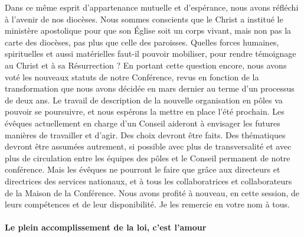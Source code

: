Dans ce même esprit d’appartenance mutuelle et d’espérance, nous avons réfléchi à l’avenir de nos diocèses. Nous sommes conscients que le Christ a institué le ministère apostolique pour que son Église soit un corps vivant, mais non pas la carte des diocèses, pas plus que celle des paroisses. Quelles forces humaines, spirituelles et aussi matérielles faut-il pouvoir mobiliser, pour rendre témoignage au Christ et à sa Résurrection ? En portant cette question encore, nous avons voté les nouveaux statuts de notre Conférence, revus en fonction de la transformation que nous avons décidée en mars dernier au terme d’un processus de deux ans. Le travail de description de la nouvelle organisation en pôles va pouvoir se poursuivre, et nous espérons la mettre en place l’été prochain. Les évêques actuellement en charge d’un Conseil aideront à envisager les futures manières de travailler et d’agir. Des choix devront être faits. Des thématiques devront être assumées autrement, si possible avec plus de transversalité et avec plus de circulation entre les équipes des pôles et le Conseil permanent de notre conférence. Mais les évêques ne pourront le faire que grâce aux directeurs et directrices des services nationaux, et à tous les collaboratrices et collaborateurs de la Maison de la Conférence. Nous avons profité à nouveau, en cette session, de leurs compétences et de leur disponibilité. Je les remercie en votre nom à tous.
\paragraph{ Le plein accomplissement de la loi, c’est l’amour}


